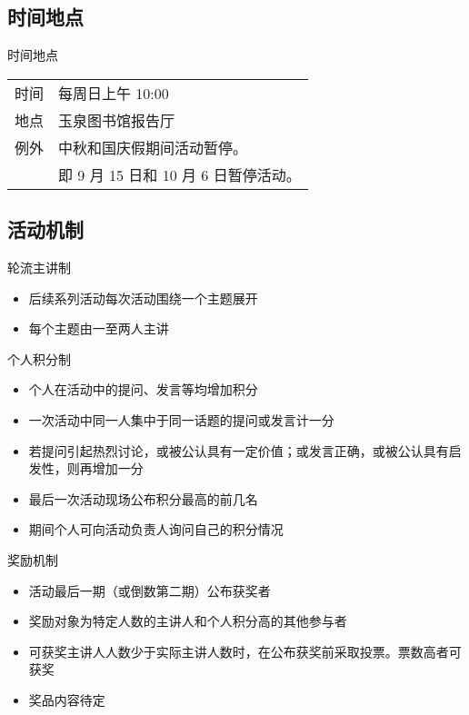 \documentclass{beamer}
\begin{document}
\subsection{时间地点}
\begin{frame}{时间地点}
\begin{tabular}{rl}
时间 & 每周日上午 10:00\\
地点 & 玉泉图书馆报告厅\\
例外 & 中秋和国庆假期间活动暂停。 \\
& 即 9 月 15 日和 10 月 6 日暂停活动。 \\
\end{tabular}
\end{frame}

\subsection{活动机制}
\begin{frame}{轮流主讲制}
\begin{itemize}
\item 后续系列活动每次活动围绕一个主题展开
\item 每个主题由一至两人主讲
\end{itemize}
\end{frame}

\begin{frame}{个人积分制}
\begin{itemize}
\item 个人在活动中的提问、发言等均增加积分
\item 一次活动中同一人集中于同一话题的提问或发言计一分
\item 若提问引起热烈讨论，或被公认具有一定价值；或发言正确，或被公认具有启发性，则再增加一分
\item 最后一次活动现场公布积分最高的前几名
\item 期间个人可向活动负责人询问自己的积分情况
\end{itemize}
\end{frame}

\begin{frame}{奖励机制}
\begin{itemize}
\item 活动最后一期（或倒数第二期）公布获奖者
\item 奖励对象为特定人数的主讲人和个人积分高的其他参与者
\item 可获奖主讲人人数少于实际主讲人数时，在公布获奖前采取投票。票数高者可获奖
\item 奖品内容待定
\end{itemize}
\end{frame}
\end{document}
